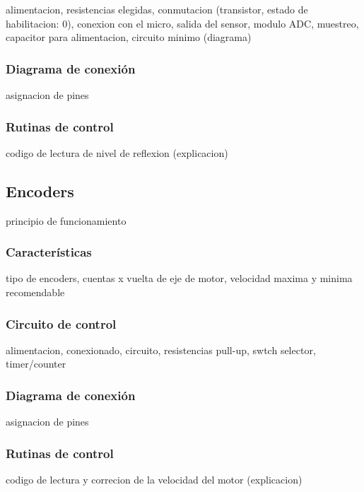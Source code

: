 alimentacion, resistencias elegidas, conmutacion (transistor, estado de habilitacion: 0), conexion con el micro, salida del sensor, modulo ADC, muestreo, capacitor para alimentacion, circuito minimo (diagrama)

\subsubsection{Diagrama de conexi\'on}
\label{}

asignacion de pines

\subsubsection{Rutinas de control}
\label{}

codigo de lectura de nivel de reflexion (explicacion)

\subsection{Encoders}
\label{}

principio de funcionamiento

\subsubsection{Caracter\'isticas}
\label{}

tipo de encoders, cuentas x vuelta de eje de motor, velocidad maxima y minima recomendable

\subsubsection{Circuito de control}
\label{}

alimentacion, conexionado, circuito, resistencias pull-up, swtch selector, timer/counter

\subsubsection{Diagrama de conexi\'on}
\label{}

asignacion de pines

\subsubsection{Rutinas de control}
\label{}

codigo de lectura y correcion de la velocidad del motor (explicacion)

